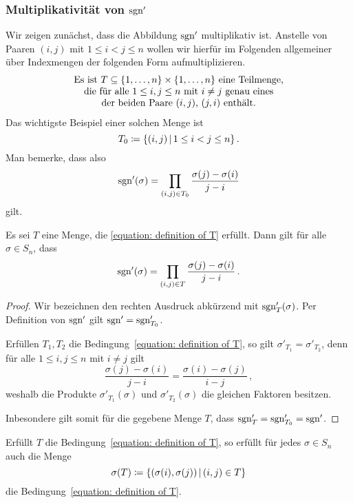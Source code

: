 \subsubsection*{Multiplikativität von $\operatorname{sgn}'$}

Wir zeigen zunächst, dass die Abbildung $\operatorname{sgn}'$ multiplikativ ist.
Anstelle von Paaren $(i,j)$ mit $1 \leq i < j \leq n$ wollen wir hierfür im Folgenden allgemeiner über Indexmengen der folgenden Form aufmultiplizieren.
\begin{equation}
\label{equation: definition of T}
  \begin{tabular}{c}
    Es ist $T \subseteq \{1, \dotsc, n\} \times \{1, \dotsc, n\}$ eine Teilmenge, \\
    die für alle $1 \leq i,j \leq n$ mit $i \neq j$ genau eines \\
    der beiden Paare $(i,j)$, $(j,i)$ enthält.
  \end{tabular}
\end{equation}
Das wichtigste Beispiel einer solchen Menge ist
\[
            T_0
  \defined  \{ (i,j) \suchthat 1 \leq i < j \leq n \} \,.
\]
Man bemerke, dass also
\[
    \operatorname{sgn}'(\sigma)
  = \prod_{(i,j) \in T_0} \frac{\sigma(j) - \sigma(i)}{j - i}
\]
gilt.


\begin{lemma}
  Es sei $T$ eine Menge, die \eqref{equation: definition of T} erfüllt.
  Dann gilt für alle $\sigma \in S_n$, dass
  \[
      \operatorname{sgn}'(\sigma)
    = \prod_{(i,j) \in T} \frac{\sigma(j) - \sigma(i)}{j - i} \,.
  \]
\end{lemma}

\begin{proof}
  Wir bezeichnen den rechten Ausdruck abkürzend mit $\operatorname{sgn}'_T(\sigma)$.
  Per Definition von $\operatorname{sgn}'$ gilt $\operatorname{sgn}' = \operatorname{sgn}'_{T_0}$.
  
  Erfüllen $T_1, T_2$ die Bedingung~\eqref{equation: definition of T}, so gilt $\sigma'_{T_1} = \sigma'_{T_2}$, denn für alle $1 \leq i, j \leq n$ mit $i \neq j$ gilt
  \[
      \frac{\sigma(j) - \sigma(i)}{j - i}
    = \frac{\sigma(i) - \sigma(j)}{i - j} \,,
  \]
  weshalb die Produkte $\sigma'_{T_1}(\sigma)$ und $\sigma'_{T_2}(\sigma)$ die gleichen Faktoren besitzen.
  
  Inbesondere gilt somit für die gegebene Menge $T$, dass $\operatorname{sgn}'_{T} = \operatorname{sgn}'_{T_0} = \operatorname{sgn}'$.
\end{proof}

\begin{lemma}
  Erfüllt $T$ die Bedingung~\eqref{equation: definition of T}, so erfüllt für jedes $\sigma \in S_n$ auch die Menge
  \[
              \sigma(T)
    \defined  \{(\sigma(i), \sigma(j)) \suchthat (i,j) \in T\}
  \]
  die Bedingung~\eqref{equation: definition of T}.
\end{lemma}

